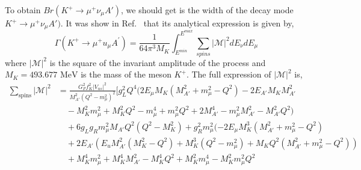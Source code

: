 \documentclass[onecolumn, aps, nofootinbib, prd, preprint, floats, floatfix, amsmath, amssymb, superscriptaddress, preprintnumbers]{revtex4-2}
\begin{document}
{To obtain $Br(K^+ \to \mu^+ \nu_\mu A')$, we should get is the width of the decay mode $K^+ \to \mu^+ \nu_\mu A')$. It was show in Ref.~\cite{cogollo2025constraints} that its analytical expression is given by,
\begin{equation}
\Gamma(K^{+} \rightarrow \mu^{+} 
u_{\mu} A^{\prime}) = \frac{1}{64\pi^{3}M_{K}} \int_{E^{min}}^{E^{max}} \sum_{spins} |\mathcal{M}|^{2} dE_{\nu} dE_{\mu}
\end{equation}
where $|\mathcal{M}|^{2}$ is the square of the invariant amplitude of the process and $M_{K} = 493.677\text{ MeV}$ is the mass of the meson $K^{+}$. 
The full expression of $|\mathcal{M}|^{2}$ is,
\begin{equation}
\begin{split}
\sum_{\text{spins}} |\mathcal{M}|^2 &= \frac{G_F^2 f_K^2 |V_{us}|^2}{M_{A'}^2 (Q^2 - m_\mu^2)^2} \Big[ g_L^2 Q^4 (2 E_\mu M_K (M_{A'}^2 + m_\mu^2 - Q^2) - 2 E_{A'} M_K M_{A'}^2 \\
&\quad - M_K^2 m_\mu^2 + M_K^2 Q^2 - m_\mu^4 + m_\mu^2 Q^2 + 2 M_{A'}^4 - m_\mu^2 M_{A'}^2 - M_{A'}^2 Q^2) \\
&\quad + 6 g_L g_R m_\mu^2 M_{A'} Q^2 (Q^2 - M_K^2) + g_R^2 m_\mu^2 (-2 E_\mu M_K^3 (M_{A'}^2 + m_\mu^2 - Q^2) \\
&\quad + 2 E_{A'} (E_
u M_{A'}^2 (M_K^2 - Q^2) + M_K^3 (Q^2 - m_\mu^2) + M_K Q^2 (M_{A'}^2 + m_\mu^2 - Q^2)) \\
&\quad + M_K^4 m_\mu^2 + M_K^4 M_{A'}^2 - M_K^4 Q^2 + M_K^2 m_\mu^4 - M_K^2 m_\mu^2 Q^2 \\

\end{split}
\end{equation}}
\end{document}
